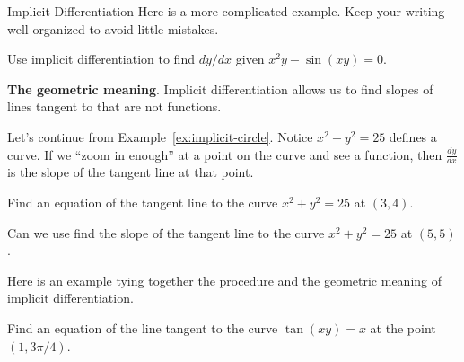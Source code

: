 \documentclass[../main.tex]{subfiles}
\begin{document}
\begin{lesson}{Implicit Differentiation}
  Here is a more complicated example. Keep your writing well-organized to avoid little mistakes.
  \begin{example}
    Use implicit differentiation to find \(dy/dx\) given \(x^{2}y - \sin(xy) = 0\).

  \end{example}

  \clearpage
  \textbf{The geometric meaning}. Implicit differentiation allows us to find slopes of lines tangent to  that are not functions. 

  Let's continue from Example~\ref{ex:implicit-circle}. Notice \(x^{2} + y^{2} = 25\) defines a curve. If we ``zoom in enough'' at a point on the curve and see a function, then \(\tfrac{dy}{dx}\) is the slope of the tangent line at that point. 


  \begin{example}
    Find an equation of the tangent line to the curve \(x^{2} + y^{2} = 25\) at \((3,4)\).
  \end{example}

  \faComment{} Can we use find the slope of the tangent line to the curve \(x^{2} + y^{2} = 25\) at \((5,5)\).

  \clearpage
  Here is an example tying together the procedure and the geometric meaning of implicit differentiation.
  \begin{example}
    Find an equation of the line tangent to the curve \(\tan(xy) = x\) at the point \((1,3\pi/4)\).
  \end{example}
\end{lesson}
\end{document}
